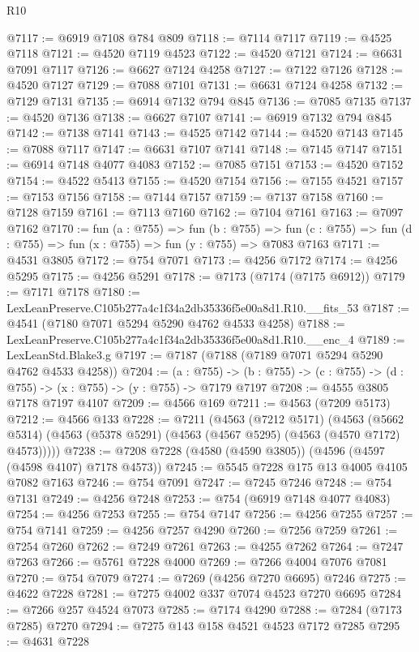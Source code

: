 \begin{lexlean}{R10}
\begin{coremodule}
@7117 := @6919 @7108 @784 @809
@7118 := @7114 @7117
@7119 := @4525 @7118
@7121 := @4520 @7119 @4523
@7122 := @4520 @7121
@7124 := @6631 @7091 @7117
@7126 := @6627 @7124 @4258
@7127 := @7122 @7126
@7128 := @4520 @7127
@7129 := @7088 @7101
@7131 := @6631 @7124 @4258
@7132 := @7129 @7131
@7135 := @6914 @7132 @794 @845
@7136 := @7085 @7135
@7137 := @4520 @7136
@7138 := @6627 @7107
@7141 := @6919 @7132 @794 @845
@7142 := @7138 @7141
@7143 := @4525 @7142
@7144 := @4520 @7143
@7145 := @7088 @7117
@7147 := @6631 @7107 @7141
@7148 := @7145 @7147
@7151 := @6914 @7148 @4077 @4083
@7152 := @7085 @7151
@7153 := @4520 @7152
@7154 := @4522 @5413
@7155 := @4520 @7154
@7156 := @7155 @4521
@7157 := @7153 @7156
@7158 := @7144 @7157
@7159 := @7137 @7158
@7160 := @7128 @7159
@7161 := @7113 @7160
@7162 := @7104 @7161
@7163 := @7097 @7162
@7170 := fun (a : @755) =>
  fun (b : @755) =>
  fun (c : @755) => fun (d : @755) => fun (x : @755) => fun (y : @755) => @7083 @7163
@7171 := @4531 @3805
@7172 := @754 @7071
@7173 := @4256 @7172
@7174 := @4256 @5295
@7175 := @4256 @5291
@7178 := @7173 (@7174 (@7175 @6912))
@7179 := @7171 @7178
@7180 := LexLeanPreserve.C105b277a4c1f34a2db35336f5e00a8d1.R10.__fits_53
@7187 := @4541 (@7180 @7071 @5294 @5290 @4762 @4533 @4258)
@7188 := LexLeanPreserve.C105b277a4c1f34a2db35336f5e00a8d1.R10.__enc_4
@7189 := LexLeanStd.Blake3.g
@7197 := @7187 (@7188 (@7189 @7071 @5294 @5290 @4762 @4533 @4258))
@7204 := (a : @755) ->
  (b : @755) -> (c : @755) -> (d : @755) -> (x : @755) -> (y : @755) -> @7179 @7197
@7208 := @4555 @3805 @7178 @7197 @4107
@7209 := @4566 @169
@7211 := @4563 (@7209 @5173)
@7212 := @4566 @133
@7228 := @7211
    (@4563
      (@7212 @5171)
      (@4563 (@5662 @5314) (@4563 (@5378 @5291) (@4563 (@4567 @5295) (@4563 (@4570 @7172) @4573)))))
@7238 := @7208 @7228 (@4580 (@4590 @3805)) (@4596 (@4597 (@4598 @4107) @7178 @4573))
@7245 := @5545 @7228 @175 @13 @4005 @4105 @7082 @7163
@7246 := @754 @7091
@7247 := @7245 @7246
@7248 := @754 @7131
@7249 := @4256 @7248
@7253 := @754 (@6919 @7148 @4077 @4083)
@7254 := @4256 @7253
@7255 := @754 @7147
@7256 := @4256 @7255
@7257 := @754 @7141
@7259 := @4256 @7257 @4290
@7260 := @7256 @7259
@7261 := @7254 @7260
@7262 := @7249 @7261
@7263 := @4255 @7262
@7264 := @7247 @7263
@7266 := @5761 @7228 @4000
@7269 := @7266 @4004 @7076 @7081
@7270 := @754 @7079
@7274 := @7269 (@4256 @7270 @6695) @7246
@7275 := @4622 @7228
@7281 := @7275 @4002 @337 @7074 @4523 @7270 @6695
@7284 := @7266 @257 @4524 @7073
@7285 := @7174 @4290
@7288 := @7284 (@7173 @7285) @7270
@7294 := @7275 @143 @158 @4521 @4523 @7172 @7285
@7295 := @4631 @7228

\end{coremodule}
\end{lexlean}
